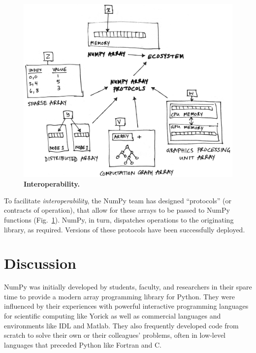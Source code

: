 \begin{figure}
  \centering
  \includegraphics[width=.45\textwidth]{static/sketches/duck-arrays}
  \caption{\textbf{Interoperability.} }\label{fig:duck-arrays}
\end{figure}


To facilitate \emph{interoperability}, the NumPy team has designed
``protocols'' (or contracts of operation), that allow for these arrays to be
passed to NumPy functions (Fig.~\ref{fig:duck-arrays}).
NumPy, in turn, dispatches operations to the originating library, as required.
Versions of these protocols have been successfully deployed.


\section*{Discussion}


NumPy was initially developed by students, faculty, and researchers in their
spare time to provide a modern array programming library for Python.  They were
influenced by their experiences with powerful interactive programming languages
for scientific computing like Yorick \cite{munro1995using} as well as
commercial languages and environments like IDL and Matlab.  They also
frequently developed code from scratch to solve their own or their colleagues'
problems, often in low-level languages that preceded Python like Fortran
\cite{dongarra2008netlib} and C.

